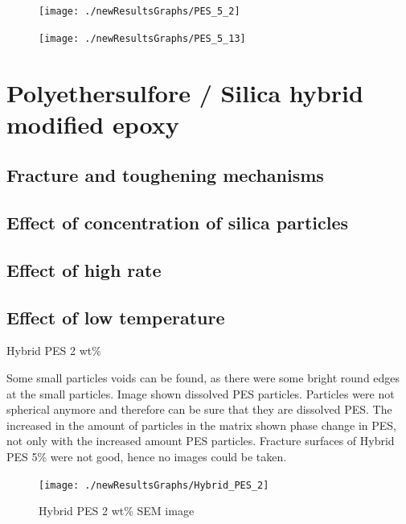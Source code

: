 \documentclass[numbers=noendperiod,chapterprefix=on]{icldt} %
\begin{document}
\begin{figure}[!hp]
\centering
\texttt{[image: ./newResultsGraphs/PES\_5\_2]}
\caption{} \label{PES_5_2}
\end{figure}
\FloatBarrier
 
\begin{figure}[!hp]
\centering
\texttt{[image: ./newResultsGraphs/PES\_5\_13]}
\caption{} \label{PES_5_13}
\end{figure}
\FloatBarrier
 
\section{Polyethersulfore / Silica hybrid modified epoxy} \label{Hybrid_PES_SEM}

\subsection{Fracture and toughening mechanisms}

\subsection{Effect of concentration of silica particles}

\subsection{Effect of high rate}

\subsection{Effect of low temperature}
 
Hybrid PES 2 wt\%

Some small particles voids can be found, as there were some bright round edges at the small particles. Image shown dissolved PES particles. Particles were not spherical anymore and therefore can be sure that they are dissolved PES. The increased in the amount of particles in the matrix shown phase change in PES, not only with the increased amount PES particles.
Fracture surfaces of Hybrid PES 5\% were not good, hence no images could be taken.
 
\begin{figure}[!hp]
\centering
\texttt{[image: ./newResultsGraphs/Hybrid\_PES\_2]}
\caption{Hybrid PES 2 wt\% SEM image} \label{Hybrid_PES_2}
\end{figure}
\FloatBarrier
\end{document}
